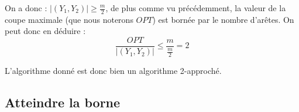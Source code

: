 On a donc : $|(Y_1,Y_2)| \geq \frac{m}{2}$, de plus comme vu précédemment, la valeur de la coupe
maximale (que nous noterons $OPT$) est bornée par le nombre d'arêtes. On peut donc en déduire : $$
\frac{OPT}{|(Y_1,Y_2)|} \leq \frac{m}{\frac{m}{2}} = 2 $$

L'algorithme donné est donc bien un algorithme 2-approché.

\subsection{Atteindre la borne}
